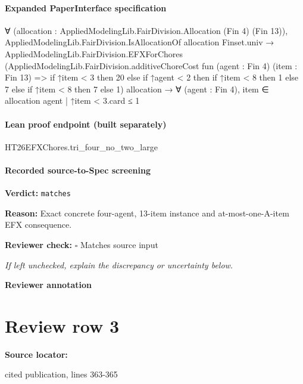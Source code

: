 \documentclass[10pt]{article}
\newcommand{\reviewerbox}{%
  \par\noindent\fbox{\parbox{0.96\linewidth}{\rule{0pt}{0.38in}}}\par
}
\newcommand{\reviewmatch}[1]{%
  \par\noindent\textbf{Reviewer check:} $\square$\; #1\par
  \noindent\emph{If left unchecked, explain the discrepancy or uncertainty below.}\par
}
\begin{document}
\paragraph{Expanded PaperInterface specification}
\begin{ReviewVerbatim}
∀ (allocation : AppliedModelingLib.FairDivision.Allocation (Fin 4) (Fin 13)),
  AppliedModelingLib.FairDivision.IsAllocationOf allocation Finset.univ →
    AppliedModelingLib.FairDivision.EFXForChores
        (AppliedModelingLib.FairDivision.additiveChoreCost fun (agent : Fin 4) (item : Fin 13) =>
          if ↑item < 3 then 20 else if ↑agent < 2 then if ↑item < 8 then 1 else 7 else if ↑item < 8 then 7 else 1)
        allocation →
      ∀ (agent : Fin 4), {item ∈ allocation agent | ↑item < 3}.card ≤ 1
\end{ReviewVerbatim}



\paragraph{Lean proof endpoint (built separately)}\begin{ReviewVerbatim}
HT26EFXChores.tri_four_no_two_large
\end{ReviewVerbatim}

\paragraph{Recorded source-to-Spec screening}
\textbf{Verdict:} \texttt{matches}
\\
{\raggedright
\textbf{Reason:} Exact concrete four-\allowbreak{}agent, 13-\allowbreak{}item instance and at-\allowbreak{}most-\allowbreak{}one-\allowbreak{}A-\allowbreak{}item EFX consequence.\allowbreak{}
\par}
\reviewmatch{Matches source input}
\noindent\textbf{Reviewer annotation}\par
\reviewerbox
\clearpage
\hypertarget{source-claim-120f295a37ffc0ce}{}
\section*{Review row 3}
\textbf{Source locator:} {\footnotesize\raggedright cited publication, lines 363-\allowbreak{}365\par}
\end{document}
